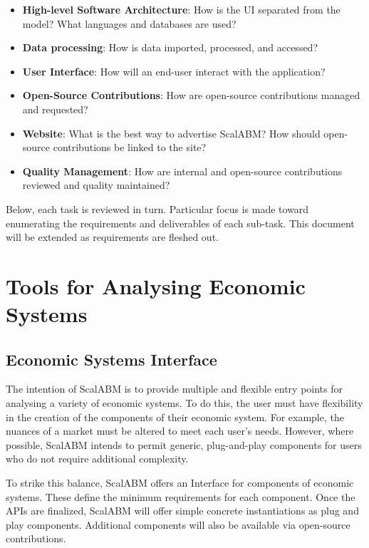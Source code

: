 \documentclass[a4paper]{article}
\begin{document}
\begin{itemize}
	\item \textbf{High-level Software Architecture}: How is the UI separated from the model? What languages and databases are used?
    \item \textbf{Data processing}: How is data imported, processed, and accessed?
    \item \textbf{User Interface}: How will an end-user interact with the application? 
    \item \textbf{Open-Source Contributions}: How are open-source contributions managed and requested?
    \item \textbf{Website}: What is the best way to advertise ScalABM? How should open-source contributions be linked to the site?
    \item \textbf{Quality Management}: How are internal and open-source contributions reviewed and quality maintained?
    \end{itemize}

Below, each task is reviewed in turn. Particular focus is made toward enumerating the requirements and deliverables of each sub-task. This document will be extended as requirements are fleshed out. 

\section{Tools for Analysing Economic Systems}

\subsection{Economic Systems Interface}
\label{Interface}

The intention of ScalABM is to provide multiple and flexible entry points for analysing a variety of economic systems. To do this, the user must have flexibility in the creation of the components of their economic system. For example, the nuances of a market must be altered to meet each user's needs. However, where possible, ScalABM intends to permit generic, plug-and-play components for users who do not require additional complexity. 

To strike this balance, ScalABM offers an Interface for components of economic systems. These define the minimum requirements for each component. Once the APIs are finalized, ScalABM will offer simple concrete instantiations as plug and play components. Additional components will also be available via open-source contributions.
\end{document}
